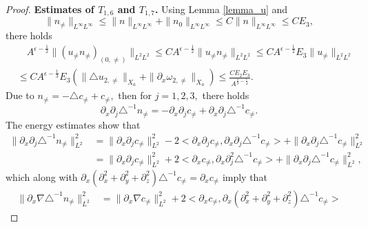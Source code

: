 \documentclass[10pt,a4paper]{amsart}
\begin{document}
\begin{proof}
		{\bf Estimates of $T_{1,6}$ and $T_{1,7}$.}
		Using Lemma \ref{lemma_u} and 
		\begin{equation}\label{n_infty}
			\|n_{\neq}\|_{L^{\infty}L^{\infty}}\leq 
			\|n\|_{L^{\infty}L^{\infty}}+\|n_0\|_{L^{\infty}L^{\infty}}
			\leq
			C\|n\|_{L^{\infty}L^{\infty}}\leq CE_3,
		\end{equation}
		there holds
		\begin{equation}\label{n0_sub1}
			\begin{aligned}
				&\quad A^{\epsilon-\frac{1}{2}}\|(u_{\neq} n_{\neq})_{(0,\neq)}\|_{L^2L^2}
				\leq CA^{\epsilon-\frac{1}{2}}\|u_{\neq} n_{\neq}\|_{L^2L^2}
				\leq CA^{\epsilon-\frac{1}{2}}
				E_3
				\|u_{\neq}\|_{L^2L^2}\\
				&\leq CA^{\epsilon-\frac{1}{3}}E_3(\| \triangle u_{2,\neq}\|_{X_a}
				+\| \partial_x \omega_{2,\neq}\|_{X_a})
				\leq 
				\frac{CE_2E_3}{ A^{\frac13-\frac{\epsilon}{4}}}.
			\end{aligned}
		\end{equation}
		Due to $n_{\neq}=-\triangle c_{\neq}+c_{\neq},$ then for $j=1,2,3,$ there holds
		\begin{equation*}
			\partial_x\partial_j\triangle^{-1}n_{\neq}
			=-\partial_x\partial_j c_{\neq}
			+\partial_x\partial_j\triangle^{-1}c_{\neq}.
		\end{equation*}
		The energy estimates show that 
		\begin{equation*}
			\begin{aligned}
				\|\partial_x\partial_j\triangle^{-1}n_{\neq}\|_{L^2}^2
				&=\|\partial_x\partial_jc_{\neq}\|_{L^2}^2
				-2<\partial_x\partial_j c_{\neq}
				,\partial_x\partial_j\triangle^{-1}c_{\neq}>
				+\|\partial_x\partial_j\triangle^{-1}c_{\neq}\|_{L^2}^2\\
				&=\|\partial_x\partial_jc_{\neq}\|_{L^2}^2
				+2<\partial_x c_{\neq}
				,\partial_x\partial_j^2\triangle^{-1}c_{\neq}>
				+\|\partial_x\partial_j\triangle^{-1}c_{\neq}\|_{L^2}^2,		
			\end{aligned}
		\end{equation*}
		which along with $\partial_x(\partial_x^2+\partial_y^2+\partial_z^2)
		\triangle^{-1}c_{\neq}=\partial_x c_{\neq}$ imply that 
		\begin{equation}\label{n_neq_11}
			\begin{aligned}
				\|\partial_x\nabla\triangle^{-1}n_{\neq}\|_{L^2}^2
				&=\|\partial_x\nabla c_{\neq}\|_{L^2}^2
				+2<\partial_x c_{\neq}
				,\partial_x(\partial_x^2+\partial_y^2+\partial_z^2)
				\triangle^{-1}c_{\neq}>

\end{aligned}
\end{equation}
\end{proof}
\end{document}
